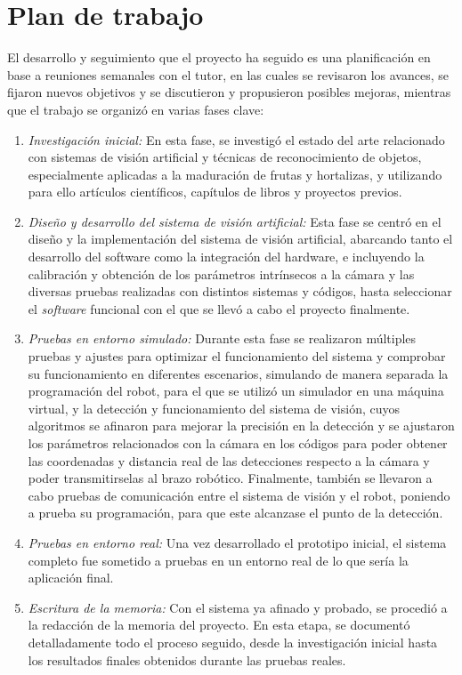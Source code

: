 	
\section{Plan de trabajo}
\label{sec:plantrabajo}
El desarrollo y seguimiento que el proyecto ha seguido es una planificación en base a reuniones semanales con el tutor, en las cuales se revisaron los avances, se fijaron nuevos objetivos y se discutieron y propusieron posibles mejoras, mientras que el trabajo se organizó en varias fases clave: 
\begin{enumerate}
  \item \textit{Investigación inicial:} En esta fase, se investigó el estado del arte relacionado con sistemas de visión artificial y técnicas de reconocimiento de objetos, especialmente aplicadas a la maduración de frutas y hortalizas, y utilizando para ello artículos científicos, capítulos de libros y proyectos previos. 
  \item \textit{Diseño y desarrollo del sistema de visión artificial:} Esta fase se centró en el diseño y la implementación del sistema de visión artificial, abarcando tanto el desarrollo del software como la integración del hardware, e incluyendo la calibración y obtención de los parámetros intrínsecos a la cámara y las diversas pruebas realizadas con distintos sistemas y códigos, hasta seleccionar el \textit{software} funcional con el que se llevó a cabo el proyecto finalmente.
  \item \textit{Pruebas en entorno simulado:} Durante esta fase se realizaron múltiples pruebas y ajustes para optimizar el funcionamiento del sistema y comprobar su funcionamiento en diferentes escenarios, simulando de manera separada la programación del robot, para el que se utilizó un simulador en una máquina virtual, y la detección y funcionamiento del sistema de visión, cuyos algoritmos se afinaron para mejorar la precisión en la detección y se ajustaron los parámetros relacionados con la cámara en los códigos para poder obtener las coordenadas y distancia real de las detecciones respecto a la cámara y poder transmitirselas al brazo robótico. Finalmente, también se llevaron a cabo pruebas de comunicación entre el sistema de visión y el robot, poniendo a prueba su programación, para que este alcanzase el punto de la detección.
  \item \textit{Pruebas en entorno real:} Una vez desarrollado el prototipo inicial, el sistema completo fue sometido a pruebas en un entorno real de lo que sería la aplicación final. 
  \item \textit{Escritura de la memoria:} Con el sistema ya afinado y probado, se procedió a la redacción de la memoria del proyecto. En esta etapa, se documentó detalladamente todo el proceso seguido, desde la investigación inicial hasta los resultados finales obtenidos durante las pruebas reales. 
\end{enumerate}
